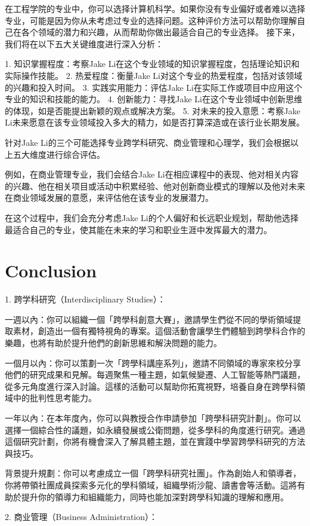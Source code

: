 \documentclass{extarticle}
\begin{document}
\begin{CJK*}{UTF8}{gbsn}
在工程学院的专业中，你可以选择计算机科学。如果你没有专业偏好或者难以选择专业，可能是因为你从未考虑过专业的选择问题。这种评价方法可以帮助你理解自己在各个领域的潜力和兴趣，从而帮助你做出最适合自己的专业选择。
接下来，我们将在以下五大关键维度进行深入分析：

1. 知识掌握程度：考察Jake Li在这个专业领域的知识掌握程度，包括理论知识和实际操作技能。
2. 热爱程度：衡量Jake Li对这个专业的热爱程度，包括对该领域的兴趣和投入时间。
3. 实践实用能力：评估Jake Li在实际工作或项目中应用这个专业的知识和技能的能力。
4. 创新能力：寻找Jake Li在这个专业领域中创新思维的体现，如是否能提出新颖的观点或解决方案。
5. 对未来的投入意愿：考察Jake Li未来愿意在该专业领域投入多大的精力，如是否打算深造或在该行业长期发展。

针对Jake Li的三个可能选择专业跨学科研究、商业管理和心理学，我们会根据以上五大维度进行综合评估。

例如，在商业管理专业，我们会结合Jake Li在相应课程中的表现、他对相关内容的兴趣、他在相关项目或活动中积累经验、他对创新商业模式的理解以及他对未来在商业领域发展的意愿，来评估他在该专业的发展潜力。

在这个过程中，我们会充分考虑Jake Li的个人偏好和长远职业规划，帮助他选择最适合自己的专业，使其能在未来的学习和职业生涯中发挥最大的潜力。
\section{Conclusion}      
1. 跨学科研究（Interdisciplinary Studies）：

一週以內：你可以組織一個「跨學科創意大賽」，邀請學生們從不同的學術領域提取素材，創造出一個有獨特視角的專案。這個活動會讓學生們體驗到跨學科合作的樂趣，也將有助於提升他們的創新思維和解決問題的能力。

一個月以內：你可以策劃一次「跨學科講座系列」，邀請不同領域的專家來校分享他們的研究成果和見解。每週聚焦一種主題，如氣候變遷、人工智能等熱門議題，從多元角度進行深入討論。這樣的活動可以幫助你拓寬視野，培養自身在跨學科領域中的批判性思考能力。

一年以內：在本年度內，你可以與教授合作申請參加「跨學科研究計劃」。你可以選擇一個綜合性的議題，如永續發展或公衛問題，從多學科的角度進行研究。通過這個研究計劃，你將有機會深入了解具體主題，並在實踐中學習跨學科研究的方法與技巧。

背景提升規劃：你可以考慮成立一個「跨學科研究社團」。作為創始人和領導者，你將帶領社團成員探索多元化的學科領域，組織學術沙龍、讀書會等活動。這將有助於提升你的領導力和組織能力，同時也能加深對跨學科知識的理解和應用。

2. 商业管理（Business Administration）：


\end{CJK*}
\end{document}
